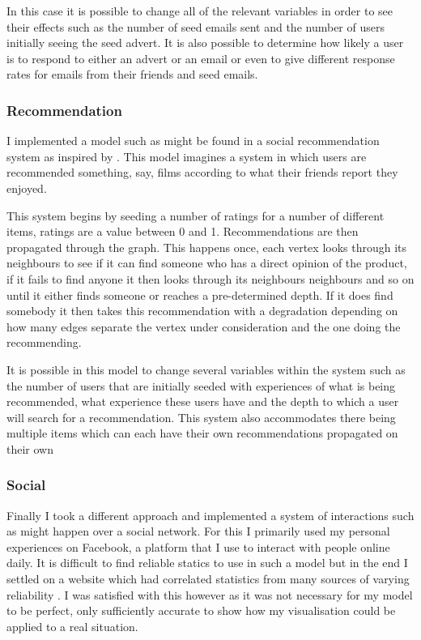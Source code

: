 \documentclass[12pt,a4paper]{article}
\begin{document}
In this case it is possible to change all of the relevant variables in order to see their effects such as the number of seed emails sent and the number of users initially seeing the seed advert. It is also possible to determine how likely a user is to respond to either an advert or an email or even to give different response rates for emails from their friends and seed emails.

\subsubsection{Recommendation}

I implemented a model such as might be found in a social recommendation system as inspired by \cite{walter2008model}. This model imagines a system in which users are recommended something, say, films according to what their friends report they enjoyed.

This system begins by seeding a number of ratings for a number of different items, ratings are a value between 0 and 1. Recommendations are then propagated through the graph. This happens once, each vertex looks through its neighbours to see if it can find someone who has a direct opinion of the product, if it fails to find anyone it then looks through its neighbours neighbours and so on until it either finds someone or reaches a pre-determined depth. If it does find somebody it then takes this recommendation with a degradation depending on how many edges separate the vertex under consideration and the one doing the recommending.

It is possible in this model to change several variables within the system such as the number of users that are initially seeded with experiences of what is being recommended, what experience these users have and the depth to which a user will search for a recommendation. This system also accommodates there being multiple items which can each have their own recommendations propagated on their own

\subsubsection{Social}

Finally I took a different approach and implemented a system of interactions such as might happen over a social network. For this I primarily used my personal experiences on Facebook, a platform that I use to interact with people online daily. It is difficult to find reliable statics to use in such a model but in the end I settled on a website which had correlated statistics from many sources of varying reliability \cite{facebookStats}. I was satisfied with this however as it was not necessary for my model to be perfect, only sufficiently accurate to show how my visualisation could be applied to a real situation.
\end{document}
